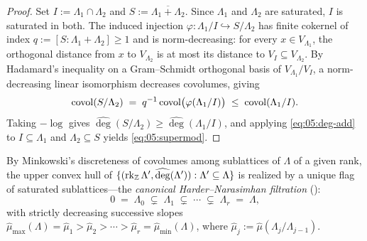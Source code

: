 \begin{proof}
Set $I := \Lambda_1 \cap \Lambda_2$ and $S := \overline{\Lambda_1 + \Lambda_2}$. Since $\Lambda_1$ and $\Lambda_2$ are saturated, $I$ is saturated in both. The induced injection $\varphi : \Lambda_1 / I \hookrightarrow S / \Lambda_2$ has finite cokernel of index $q := [S : \Lambda_1 + \Lambda_2] \ge 1$ and is norm-decreasing: for every $x \in V_{\Lambda_1}$, the orthogonal distance from $x$ to $V_{\Lambda_2}$ is at most its distance to $V_I \subseteq V_{\Lambda_2}$. By Hadamard's inequality on a Gram--Schmidt orthogonal basis of $V_{\Lambda_1}/V_I$, a norm-decreasing linear isomorphism decreases covolumes, giving
\[
  \operatorname{covol}(S / \Lambda_2) \;=\; q^{-1}\operatorname{covol}\bigl(\varphi(\Lambda_1 / I)\bigr) \;\le\; \operatorname{covol}(\Lambda_1 / I).
\]
Taking $-\log$ gives $\widehat{\deg}(S / \Lambda_2) \ge \widehat{\deg}(\Lambda_1 / I)$, and applying \eqref{eq:05:deg-add} to $I \subseteq \Lambda_1$ and $\Lambda_2 \subseteq S$ yields \eqref{eq:05:supermod}.
\end{proof}

By Minkowski's discreteness of covolumes among sublattices of $\Lambda$ of a given rank, the upper convex hull of $\{(\operatorname{rk}_{\mathbb{Z}} \Lambda', \widehat{\deg}(\Lambda')) : \Lambda' \subseteq \Lambda\}$ is realized by a unique flag of saturated sublattices—the \emph{canonical Harder--Narasimhan filtration} ():
\[
  0 \;=\; \Lambda_0 \;\subsetneq\; \Lambda_1 \;\subsetneq\; \cdots \;\subsetneq\; \Lambda_r \;=\; \Lambda,
\]
with strictly decreasing successive slopes $\widehat{\mu}_{\max}(\Lambda) = \widehat{\mu}_1 > \widehat{\mu}_2 > \cdots > \widehat{\mu}_r = \widehat{\mu}_{\min}(\Lambda)$, where $\widehat{\mu}_j := \widehat{\mu}(\Lambda_j / \Lambda_{j-1})$.

